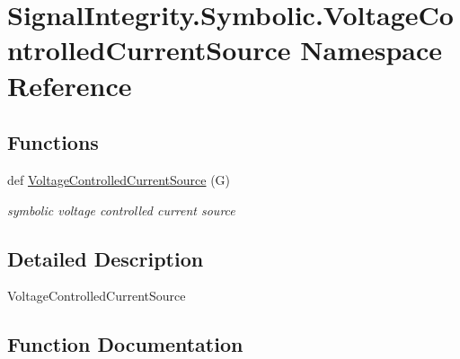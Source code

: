 \hypertarget{namespaceSignalIntegrity_1_1Symbolic_1_1VoltageControlledCurrentSource}{}\section{Signal\+Integrity.\+Symbolic.\+Voltage\+Controlled\+Current\+Source Namespace Reference}
\label{namespaceSignalIntegrity_1_1Symbolic_1_1VoltageControlledCurrentSource}
\subsection*{Functions}
\begin{DoxyCompactItemize}
\item 
def \hyperlink{namespaceSignalIntegrity_1_1Symbolic_1_1VoltageControlledCurrentSource_a5d08cb3a176a22f00635dc3ed8e2944a}{Voltage\+Controlled\+Current\+Source} (G)
\begin{DoxyCompactList}\small\item\em symbolic voltage controlled current source \end{DoxyCompactList}\end{DoxyCompactItemize}


\subsection{Detailed Description}
\begin{DoxyVerb}VoltageControlledCurrentSource\end{DoxyVerb}
 

\subsection{Function Documentation}
\mbox{\label{namespaceSignalIntegrity_1_1Symbolic_1_1VoltageControlledCurrentSource_a5d08cb3a176a22f00635dc3ed8e2944a}} 
